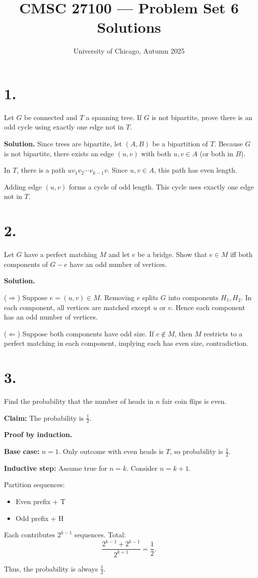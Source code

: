 \documentclass[11pt]{article}
\title{CMSC 27100 --- Problem Set 6 Solutions}
\date{University of Chicago, Autumn 2025}
\begin{document}
\maketitle

\section*{1.}
Let $G$ be connected and $T$ a spanning tree. If $G$ is not bipartite, prove there is an odd cycle using exactly one edge not in $T$.

\textbf{Solution.}
Since trees are bipartite, let $(A,B)$ be a bipartition of $T$. Because $G$ is not bipartite, there exists an edge $(u,v)$ with both $u,v \in A$ (or both in $B$).

In $T$, there is a path $u v_1 v_2 \cdots v_{k-1} v$. Since $u,v \in A$, this path has even length.

Adding edge $(u,v)$ forms a cycle of odd length. This cycle uses exactly one edge not in $T$.

\section*{2.}
Let $G$ have a perfect matching $M$ and let $e$ be a bridge. Show that $e \in M$ iff both components of $G-e$ have an odd number of vertices.

\textbf{Solution.}

($\Rightarrow$) Suppose $e=(u,v)\in M$. Removing $e$ splits $G$ into components $H_1, H_2$.
In each component, all vertices are matched except $u$ or $v$. Hence each component has an odd number of vertices.

($\Leftarrow$) Suppose both components have odd size. If $e \notin M$, then $M$ restricts to a perfect matching in each component, implying each has even size, contradiction.

\section*{3.}
Find the probability that the number of heads in $n$ fair coin flips is even.

\textbf{Claim:} The probability is $\frac{1}{2}$.

\textbf{Proof by induction.}

\textbf{Base case:} $n=1$. Only outcome with even heads is $T$, so probability is $\frac{1}{2}$.

\textbf{Inductive step:}
Assume true for $n=k$. Consider $n=k+1$.

Partition sequences:
\begin{itemize}
\item Even prefix + T
\item Odd prefix + H
\end{itemize}

Each contributes $2^{k-1}$ sequences. Total:
\[
\frac{2^{k-1} + 2^{k-1}}{2^{k+1}} = \frac{1}{2}.
\]

Thus, the probability is always $\frac{1}{2}$.
\end{document}
